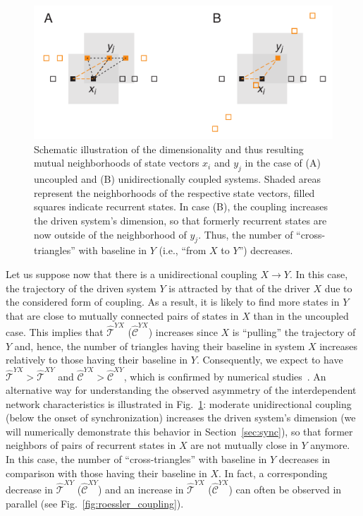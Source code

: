 \documentclass[graybox]{svmult}
\begin{document}
\begin{figure}[t!]
\centering
\includegraphics[width=\columnwidth]{clust_dimension.pdf}
\caption{Schematic illustration of the dimensionality and thus resulting mutual neighborhoods of state vectors $x_i$ and $y_j$ in the case of (A) uncoupled and (B) unidirectionally coupled systems. Shaded areas represent the neighborhoods of the respective state vectors, filled squares indicate recurrent states. In case (B), the coupling increases the driven system's dimension, so that formerly recurrent states are now outside of the neighborhood of $y_j$. Thus, the number of ``cross-triangles'' with baseline in $Y$ (i.e., ``from $X$ to $Y$'') decreases.}
\label{fig:clust_dimension}
\end{figure}

Let us suppose now that there is a unidirectional coupling $X\to Y$. In this case, the trajectory of the driven system $Y$ is attracted by that of the driver $X$ due to the considered form of coupling. As a result, it is likely to find more states in $Y$ that are close to mutually connected pairs of states in $X$ than in the uncoupled case. This implies that $\hat{\mathcal{T}}^{YX}$ ($\hat{\mathcal{C}}^{YX}$) increases since $X$ is ``pulling'' the trajectory of $Y$ and, hence, the number of triangles having their baseline in system $X$ increases relatively to those having their baseline in $Y$. Consequently, we expect to have $\hat{\mathcal{T}}^{YX}>\hat{\mathcal{T}}^{XY}$ and $\hat{\mathcal{C}}^{YX}>\hat{\mathcal{C}}^{XY}$, which is confirmed by numerical studies~\cite{Feldhoff2012}. An alternative way for understanding the observed asymmetry of the interdependent network characteristics is illustrated in Fig.~\ref{fig:clust_dimension}: moderate unidirectional coupling (below the onset of synchronization) increases the driven system's dimension \cite{Romano2007,zou2011} (we will numerically demonstrate this behavior in Section~\ref{sec:sync}), so that former neighbors of pairs of recurrent states in $X$ are not mutually close in $Y$ anymore. In this case, the number of ``cross-triangles'' with baseline in $Y$ decreases in comparison with those having their baseline in $X$. In fact, a corresponding decrease in $\hat{\mathcal{T}}^{XY}$ ($\hat{\mathcal{C}}^{XY}$) and an increase in $\hat{\mathcal{T}}^{YX}$ ($\hat{\mathcal{C}}^{YX}$) can often be observed in parallel (see Fig.~\ref{fig:roessler_coupling}).%
\end{document}
